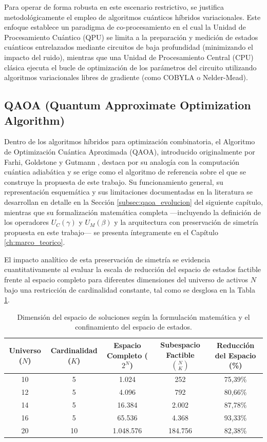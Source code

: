 Para operar de forma robusta en este escenario restrictivo, se justifica metodológicamente el empleo de algoritmos cuánticos híbridos variacionales. Este enfoque establece un paradigma de co-procesamiento en el cual la Unidad de Procesamiento Cuántico (QPU) se limita a la preparación y medición de estados cuánticos entrelazados mediante circuitos de baja profundidad (minimizando el impacto del ruido), mientras que una Unidad de Procesamiento Central (CPU) clásica ejecuta el bucle de optimización de los parámetros del circuito utilizando algoritmos variacionales libres de gradiente (como COBYLA o Nelder-Mead).

\subsection{QAOA (Quantum Approximate Optimization Algorithm)}
Dentro de los algoritmos híbridos para optimización combinatoria, el Algoritmo de Optimización Cuántica Aproximada (QAOA), introducido originalmente por Farhi, Goldstone y Gutmann \cite{Farhi2014}, destaca por su analogía con la computación cuántica adiabática y se erige como el algoritmo de referencia sobre el que se construye la propuesta de este trabajo. Su funcionamiento general, su representación esquemática y sus limitaciones documentadas en la literatura se desarrollan en detalle en la Sección \ref{subsec:qaoa_evolucion} del siguiente capítulo, mientras que su formalización matemática completa —incluyendo la definición de los operadores $U_C(\gamma)$ y $U_M(\beta)$ y la arquitectura con preservación de simetría propuesta en este trabajo— se presenta íntegramente en el Capítulo \ref{ch:marco_teorico}.

El impacto analítico de esta preservación de simetría se evidencia cuantitativamente al evaluar la escala de reducción del espacio de estados factible frente al espacio completo para diferentes dimensiones del universo de activos $N$ bajo una restricción de cardinalidad constante, tal como se desglosa en la Tabla \ref{tab:dimension_espacio}.

\begin{table}[htbp]
    \centering
    \caption{Dimensión del espacio de soluciones según la formulación matemática y el confinamiento del espacio de estados.}
    \label{tab:dimension_espacio}
    \begin{tabular}{ccccc}
        \toprule
        \textbf{Universo ($N$)} & \textbf{Cardinalidad ($K$)} & \textbf{Espacio Completo ($2^N$)} & \textbf{Subespacio Factible $\binom{N}{K}$} & \textbf{Reducción del Espacio (\%)} \\
        \midrule
        10 & 5  & 1.024        & 252       & 75,39\% \\
        12 & 5  & 4.096        & 792       & 80,66\% \\
        14 & 5  & 16.384       & 2.002     & 87,78\% \\
        16 & 5  & 65.536       & 4.368     & 93,33\% \\
        20 & 10 & 1.048.576    & 184.756   & 82,38\% \\
        \bottomrule
    \end{tabular}
\end{table}

